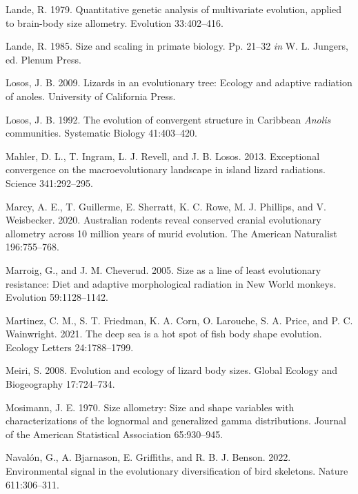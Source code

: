 \documentclass[
  11pt,
]{article}
\begin{document}
\leavevmode\hypertarget{ref-Lande1979}{}%
Lande, R. 1979. Quantitative genetic analysis of multivariate evolution,
applied to brain-body size allometry. Evolution 33:402--416.

\leavevmode\hypertarget{ref-Lande1985}{}%
Lande, R. 1985. Size and scaling in primate biology. Pp. 21--32
\emph{in} W. L. Jungers, ed. Plenum Press.

\leavevmode\hypertarget{ref-Losos2009}{}%
Losos, J. B. 2009. Lizards in an evolutionary tree: Ecology and adaptive
radiation of anoles. University of California Press.

\leavevmode\hypertarget{ref-Losos1992}{}%
Losos, J. B. 1992. The evolution of convergent structure in Caribbean
\emph{Anolis} communities. Systematic Biology 41:403--420.

\leavevmode\hypertarget{ref-Mahler2013}{}%
Mahler, D. L., T. Ingram, L. J. Revell, and J. B. Losos. 2013.
Exceptional convergence on the macroevolutionary landscape in island
lizard radiations. Science 341:292--295.

\leavevmode\hypertarget{ref-Marcy2020}{}%
Marcy, A. E., T. Guillerme, E. Sherratt, K. C. Rowe, M. J. Phillips, and
V. Weisbecker. 2020. Australian rodents reveal conserved cranial
evolutionary allometry across 10 million years of murid evolution. The
American Naturalist 196:755--768.

\leavevmode\hypertarget{ref-MarroigCheverud2005}{}%
Marroig, G., and J. M. Cheverud. 2005. Size as a line of least
evolutionary resistance: Diet and adaptive morphological radiation in
New World monkeys. Evolution 59:1128--1142.

\leavevmode\hypertarget{ref-Martinez2021}{}%
Martinez, C. M., S. T. Friedman, K. A. Corn, O. Larouche, S. A. Price,
and P. C. Wainwright. 2021. The deep sea is a hot spot of fish body
shape evolution. Ecology Letters 24:1788--1799.

\leavevmode\hypertarget{ref-Meiri2008}{}%
Meiri, S. 2008. Evolution and ecology of lizard body sizes. Global
Ecology and Biogeography 17:724--734.

\leavevmode\hypertarget{ref-Mosimann1970}{}%
Mosimann, J. E. 1970. Size allometry: Size and shape variables with
characterizations of the lognormal and generalized gamma distributions.
Journal of the American Statistical Association 65:930--945.

\leavevmode\hypertarget{ref-Navalon2022}{}%
Navalón, G., A. Bjarnason, E. Griffiths, and R. B. J. Benson. 2022.
Environmental signal in the evolutionary diversification of bird
skeletons. Nature 611:306--311.
\end{document}
